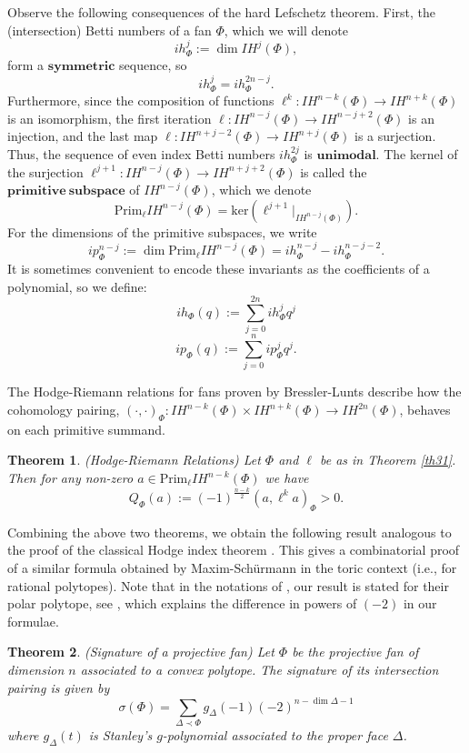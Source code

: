 \documentclass[10pt,a4paper]{amsart}
\newtheorem{thm}{Theorem}[section]
\begin{document}
Observe the following consequences of the hard Lefschetz theorem. First, the (intersection) Betti numbers of a fan $\Phi$, which we will denote \[ih^j_\Phi:=\dim IH^j(\Phi),\] form a $\mathbf{symmetric}$ sequence, so \[ih_\Phi^j=ih_\Phi^{2n-j}.\] Furthermore, since the composition of functions $\ell^{k}:IH^{n-k}(\Phi)\rightarrow IH^{n+k}(\Phi)$ is an isomorphism, the first iteration $\ell:IH^{n-j}(\Phi)\rightarrow IH^{n-j+2}(\Phi)$ is an injection, and the last map $\ell:IH^{n+j-2}(\Phi)\rightarrow IH^{n+j}(\Phi)$ is a surjection. Thus, the sequence of even index Betti numbers $ih_\Phi^{2j}$ is $\mathbf{unimodal}$. The kernel of the surjection $\ell^{j+1}:IH^{n-j}(\Phi)\rightarrow IH^{n+j+2}(\Phi)$ is called the $\mathbf{primitive\ subspace}$ of $IH^{n-j}(\Phi)$, which we denote \[\text{Prim}_\ell IH^{n-j}(\Phi)=\text{ker}(\ell^{j+1}|_{IH^{n-j}(\Phi)}).\] For the dimensions of the primitive subspaces, we write \[ip_\Phi^{n-j}:=\dim \text{Prim}_\ell IH^{n-j}(\Phi)=ih_\Phi^{n-j}-ih_\Phi^{n-j-2}.\] It is sometimes convenient to encode these invariants as the coefficients of a polynomial, so we define: $$ih_\Phi(q):=\sum_{j=0}^{2n} ih_\Phi^j q^j$$
$$ip_\Phi(q):=\sum_{j=0}^{n} ip_\Phi^j q^j.$$


The Hodge-Riemann relations for fans proven by Bressler-Lunts \cite{BL2} describe how the cohomology pairing, $(\cdot,\cdot)_\Phi:IH^{n-k}(\Phi)\times IH^{n+k}(\Phi)\rightarrow IH^{2n}(\Phi)$, behaves on each primitive summand.


\begin{thm} (Hodge-Riemann Relations) Let $\Phi$ and $\ell$ be as in Theorem \ref{th31}. Then for any non-zero $a\in \text{Prim}_\ell IH^{n-k}(\Phi)$ we have $$Q_\Phi(a):=(-1)^\frac{n-k}{2}(a,\ell^ka)_\Phi>0.$$
\end{thm}

Combining the above two theorems, we obtain the following result analogous to the proof of the classical Hodge index theorem \cite{H}. This gives a combinatorial proof of a similar formula obtained by Maxim-Sch\"urmann \cite[Example 5.8, Example 6.7]{MS} in the toric context (i.e., for rational polytopes). Note that in the notations of \cite{MS}, our result is stated for their polar polytope, see \cite[Formula (6.13)]{MS}, which explains the difference in powers of $(-2)$ in our formulae. 


\begin{thm} (Signature of a projective fan) \label{th33} Let $\Phi$ be the projective fan of dimension $n$ associated to a convex polytope. The signature of its intersection pairing is given by $$\sigma(\Phi)=\sum_{\Delta\prec\Phi} g_\Delta(-1)(-2)^{n-\dim\Delta-1}$$
where $g_\Delta(t)$ is Stanley's $g$-polynomial associated to the proper face $\Delta$.
\end{thm}
\end{document}
